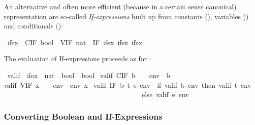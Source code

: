 \begin{isabellebody}
\begin{isamarkuptext}
An alternative and often more efficient (because in a certain sense
canonical) representation are so-called \emph{If-expressions} built up
from constants (), variables () and conditionals
():%
\end{isamarkuptext}%
\isamarkuptrue%
\isamarkupfalse%
\ ifex\ {}\ CIF\ bool\ {}\ VIF\ nat\ {}\ IF\ ifex\ ifex\ ifex%
\begin{isamarkuptext}%
\noindent
The evaluation of If-expressions proceeds as for :%
\end{isamarkuptext}%
\isamarkuptrue%
\isamarkupfalse%
\ valif\ {}{}\ {}ifex\ {}\ {}nat\ {}\ bool{}\ {}\ bool{}\ \isanewline
{}valif\ {}CIF\ b{}\ \ \ \ env\ {}\ b{}\ {}\isanewline
{}valif\ {}VIF\ x{}\ \ \ \ env\ {}\ env\ x{}\ {}\isanewline
{}valif\ {}IF\ b\ t\ e{}\ env\ {}\ {}if\ valif\ b\ env\ then\ valif\ t\ env\isanewline
\ \ \ \ \ \ \ \ \ \ \ \ \ \ \ \ \ \ \ \ \ \ \ \ \ \ \ \ \ \ \ \ \ \ \ \ \ \ \ \ else\ valif\ e\ env{}{}%
\begin{isamarkuptext}%
\subsubsection{Converting Boolean and If-Expressions}


\end{isamarkuptext}
\end{isabellebody}
